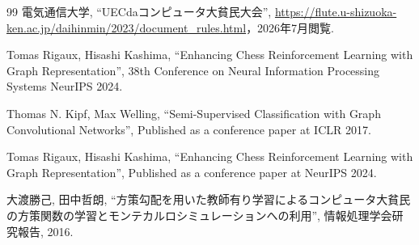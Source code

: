 \documentclass[a4j,dvipdfmx]{jarticle}
\begin{document}
\begin{Abstract}
\begin{thebibliography}{99}
 電気通信大学,
         ``UECdaコンピュータ大貧民大会'',
         \url{https://flute.u-shizuoka-ken.ac.jp/daihinmin/2023/document_rules.html}，2026年7月閲覧.

 Tomas Rigaux, Hisashi Kashima, ``Enhancing Chess Reinforcement Learning with Graph Representation'', 38th Conference on Neural Information Processing Systems NeurIPS 2024.

 Thomas N. Kipf, Max Welling, ``Semi-Supervised Classification with Graph Convolutional Networks'', Published as a conference paper at ICLR 2017.

 Tomas Rigaux, Hisashi Kashima, ``Enhancing Chess Reinforcement Learning with Graph Representation'', Published as a conference paper at NeurIPS 2024.

 大渡勝己, 田中哲朗, ``方策勾配を用いた教師有り学習によるコンピュータ大貧民の方策関数の学習とモンテカルロシミュレーションへの利用'', 情報処理学会研究報告, 2016.


  
\end{thebibliography}

\end{Abstract}
\end{document}
